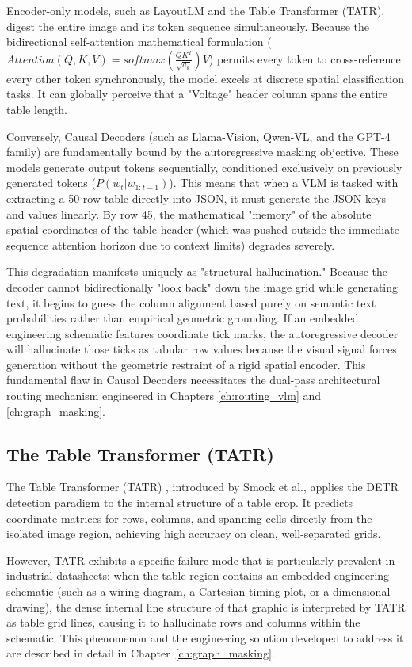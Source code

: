 Encoder-only models, such as LayoutLM and the Table Transformer (TATR), digest the entire image and its token sequence simultaneously. Because the bidirectional self-attention mathematical formulation ($Attention(Q,K,V) = softmax(\frac{QK^T}{\sqrt{d_k}})V$) permits every token to cross-reference every other token synchronously, the model excels at discrete spatial classification tasks. It can globally perceive that a "Voltage" header column spans the entire table length.

Conversely, Causal Decoders (such as Llama-Vision, Qwen-VL, and the GPT-4 family) are fundamentally bound by the autoregressive masking objective. These models generate output tokens sequentially, conditioned exclusively on previously generated tokens ($P(w_t | w_{1:t-1})$). This means that when a VLM is tasked with extracting a 50-row table directly into JSON, it must generate the JSON keys and values linearly. By row 45, the mathematical "memory" of the absolute spatial coordinates of the table header (which was pushed outside the immediate sequence attention horizon due to context limits) degrades severely.

This degradation manifests uniquely as "structural hallucination." Because the decoder cannot bidirectionally "look back" down the image grid while generating text, it begins to guess the column alignment based purely on semantic text probabilities rather than empirical geometric grounding. If an embedded engineering schematic features coordinate tick marks, the autoregressive decoder will hallucinate those ticks as tabular row values because the visual signal forces generation without the geometric restraint of a rigid spatial encoder. This fundamental flaw in Causal Decoders necessitates the dual-pass architectural routing mechanism engineered in Chapters \ref{ch:routing_vlm} and \ref{ch:graph_masking}.

\subsection{The Table Transformer (TATR)}

The Table Transformer (TATR) \citep{tatr}, introduced by Smock et al., applies the DETR detection paradigm to the internal structure of a table crop. It predicts coordinate matrices for rows, columns, and spanning cells directly from the isolated image region, achieving high accuracy on clean, well-separated grids.

However, TATR exhibits a specific failure mode that is particularly prevalent in industrial datasheets: when the table region contains an embedded engineering schematic (such as a wiring diagram, a Cartesian timing plot, or a dimensional drawing), the dense internal line structure of that graphic is interpreted by TATR as table grid lines, causing it to hallucinate rows and columns within the schematic. This phenomenon and the engineering solution developed to address it are described in detail in Chapter~\ref{ch:graph_masking}.


